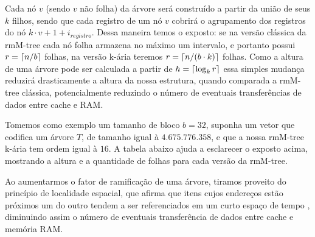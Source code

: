 Cada nó $v$ (sendo $v$ não folha) da árvore será construído a partir da união de seus $k$ filhos, sendo que cada registro de um nó $v$ cobrirá o agrupamento dos registros do nó $k \cdot v +1 + i_{registro}$. 
Dessa maneira temos o exposto: se na versão clássica  da rmM-tree cada nó folha armazena no máximo um intervalo, e portanto possui $r=\lceil n/b\rceil$ folhas, 
na versão k-ária teremos $r=\lceil n/(b \cdot k)\rceil$ folhas. Como a altura de uma árvore pode ser calculada a partir de $h = \lceil\log_k r\rceil$ essa simples mudança reduzirá drasticamente a altura da nossa estrutura,
quando comparada a rmM-tree clássica,  potencialmente reduzindo o número de eventuais transferências de dados entre cache e RAM.

Tomemos como exemplo um tamanho de bloco $b = 32$, suponha um vetor que codifica um árvore $T$, de tamanho igual à  $4.675.776.358$, e que a nossa rmM-tree k-ária tem ordem igual à $16$. A tabela abaixo ajuda a esclarecer o exposto acima, mostrando a altura e a quantidade de folhas para cada versão da rmM-tree.


\begin{table}[h!]
    \centering
    \caption[Diferentes range min-Max tree sobree um conjunto de dados]{Altua e número de nós folhas para uma rmM-tree binária e k-ária}
    \label{tbl:dataset}
  \end{table}

 Ao aumentarmos o fator de ramificação de uma árvore, tiramos proveito do princípio de localidade espacial, que afirma que itens cujos endereços estão próximos um do outro tendem a ser referenciados em um curto espaço de tempo \citep{book-computer-architecutre}, diminuindo assim o número de eventuais transferência de dados entre cache e memória RAM.
 
